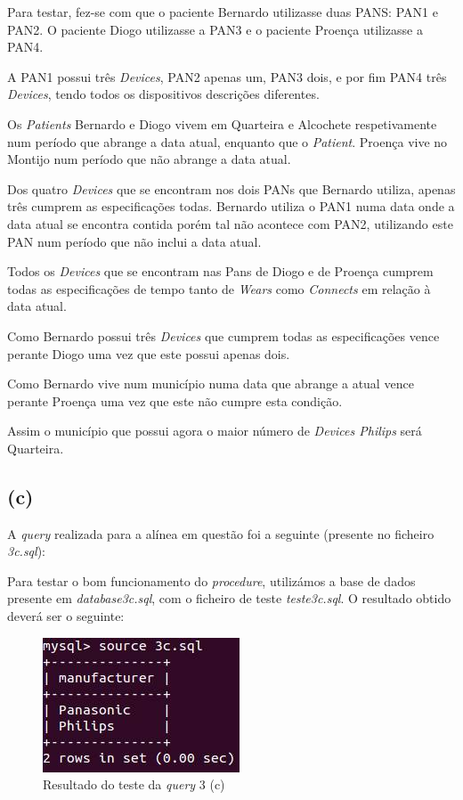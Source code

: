 \documentclass[a4paper]{article}
\begin{document}
	Para testar, fez-se com que o paciente Bernardo utilizasse duas PANS: PAN1
	e PAN2. O paciente Diogo utilizasse a PAN3 e o paciente Proença utilizasse a PAN4.
	
	A PAN1 possui três \textit{Devices}, PAN2 apenas um, PAN3 dois, e por
	fim PAN4 três \textit{Devices}, tendo todos os dispositivos descrições diferentes.
	
	Os \textit{Patients} Bernardo e Diogo vivem em Quarteira e Alcochete respetivamente num período que abrange a data atual, enquanto que o \textit{Patient}.
	Proença vive no Montijo num período que não abrange a data atual.
	
	Dos quatro \textit{Devices} que se encontram nos dois PANs que Bernardo utiliza, apenas
	três cumprem as especificações todas. Bernardo utiliza o PAN1 numa data 
	onde a data atual se encontra contida porém tal não acontece com PAN2,
	utilizando este PAN num período que não inclui a data atual.
	
	Todos os \textit{Devices} que se encontram nas Pans de Diogo e de Proença
	cumprem todas as especificações de tempo tanto de \textit{Wears} como \textit{Connects}
	em relação à data atual.
	
	Como Bernardo possui três \textit{Devices} que cumprem todas as especificações
	vence perante Diogo uma vez que este possui apenas dois.
	
	Como Bernardo vive num município numa data que abrange a atual vence
	perante Proença uma vez que este não cumpre esta condição.
	
	Assim o município que possui agora o maior número de \textit{Devices Philips}
	será Quarteira.
	
\subsection*{(c)}
A \textit{query} realizada para a alínea em questão foi a seguinte (presente no ficheiro \textit{3c.sql}):



Para testar o bom funcionamento do \textit{procedure}, utilizámos a base de dados presente em \textit{database3c.sql}, com o ficheiro de teste \textit{teste3c.sql}.
O resultado obtido deverá ser o seguinte:

\begin{figure}[ht!]
\centering
\includegraphics[scale=0.53]{teste3c.jpg}
\caption{Resultado do teste da \textit{query} 3 (c)}
\end{figure}
\end{document}
